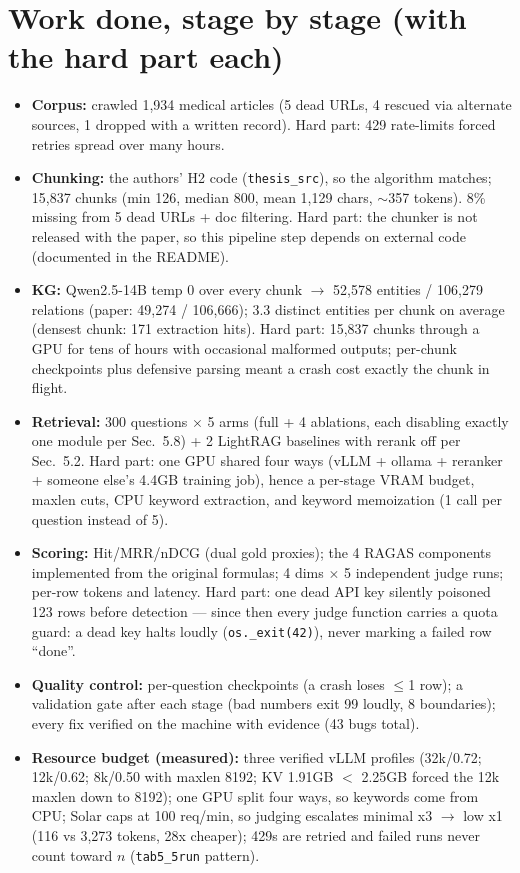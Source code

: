 \documentclass[12pt,a4paper]{article}
\begin{document}
\section{Work done, stage by stage (with the hard part each)}
\begin{itemize}[leftmargin=*]
\item \textbf{Corpus:} crawled 1,934 medical articles (5 dead URLs, 4 rescued
via alternate sources, 1 dropped with a written record). Hard part: 429
rate-limits forced retries spread over many hours.
\item \textbf{Chunking:} the authors' H2 code (\texttt{thesis\_src}), so the
algorithm matches; 15,837 chunks (min 126, median 800, mean 1,129 chars,
$\sim$357 tokens). 8\% missing from 5 dead URLs + doc filtering. Hard part:
the chunker is not released with the paper, so this pipeline step depends on
external code (documented in the README).
\item \textbf{KG:} Qwen2.5-14B temp 0 over every chunk $\rightarrow$ 52,578
entities / 106,279 relations (paper: 49,274 / 106,666); 3.3 distinct entities
per chunk on average (densest chunk: 171 extraction hits). Hard part: 15,837
chunks through a GPU for tens of hours with occasional malformed outputs;
per-chunk checkpoints plus defensive parsing meant a crash cost exactly the
chunk in flight.
\item \textbf{Retrieval:} 300 questions $\times$ 5 arms (full + 4 ablations,
each disabling exactly one module per Sec.~5.8) + 2 LightRAG baselines with
rerank off per Sec.~5.2. Hard part: one GPU shared four ways (vLLM + ollama +
reranker + someone else's 4.4GB training job), hence a per-stage VRAM budget,
maxlen cuts, CPU keyword extraction, and keyword memoization (1 call per
question instead of 5).
\item \textbf{Scoring:} Hit/MRR/nDCG (dual gold proxies); the 4 RAGAS
components implemented from the original formulas; 4 dims $\times$ 5
independent judge runs; per-row tokens and latency. Hard part: one dead API
key silently poisoned 123 rows before detection --- since then every judge
function carries a quota guard: a dead key halts loudly
(\texttt{os.\_exit(42)}), never marking a failed row ``done''.
\item \textbf{Quality control:} per-question checkpoints (a crash loses
$\le$1 row); a validation gate after each stage (bad numbers exit 99 loudly,
8 boundaries); every fix verified on the machine with evidence (43 bugs total).
\item \textbf{Resource budget (measured):} three verified vLLM profiles
(32k/0.72; 12k/0.62; 8k/0.50 with maxlen 8192; KV 1.91GB $<$ 2.25GB forced the
12k maxlen down to 8192); one GPU split four ways, so keywords come from CPU;
Solar caps at 100 req/min, so judging escalates minimal x3 $\rightarrow$ low
x1 (116 vs 3,273 tokens, 28x cheaper); 429s are retried and failed runs never
count toward $n$ (\texttt{tab5\_5run} pattern).
\end{itemize}
\end{document}
